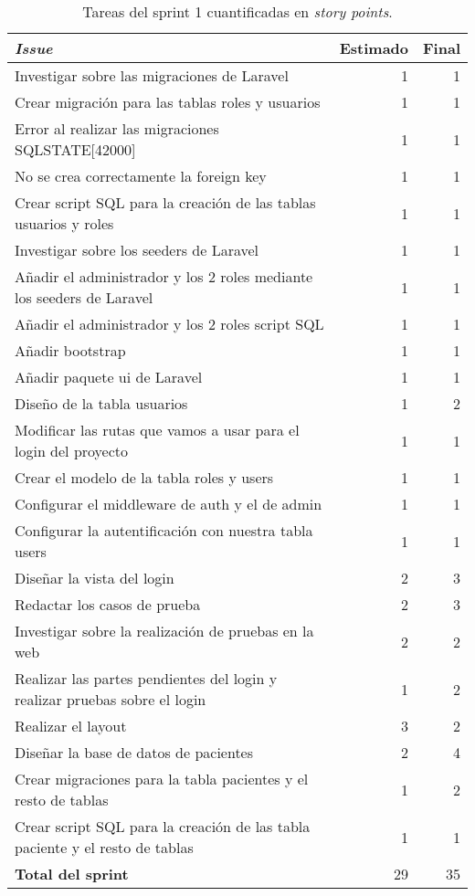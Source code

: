 \begin{table}[H]
	 \begin{tabularx}{\linewidth}{X r r}
	 	\toprule \textbf{\textit{Issue}} & \textbf{Estimado} & \textbf{Final}\\
	 	\toprule
	 	Investigar sobre las migraciones de Laravel  & 1 & 1 \\
	 	Crear migración para las tablas roles y usuarios & 1 & 1\\
	 	Error al realizar las migraciones SQLSTATE[42000] & 1 & 1 \\
	 	No se crea correctamente la foreign key & 1 & 1 \\
	 	Crear script SQL para la creación de las tablas usuarios y roles & 1 & 1 \\
	 	Investigar sobre los seeders de Laravel & 1 & 1 \\
	 	Añadir el administrador y los 2 roles mediante los seeders de Laravel & 1 & 1 \\
	 	Añadir el administrador y los 2 roles script SQL & 1 & 1 \\
	 	Añadir bootstrap & 1 & 1\\
	 	Añadir paquete ui de Laravel & 1 & 1 \\
	 	Diseño de la tabla usuarios & 1 & 2 \\
	 	Modificar las rutas que vamos a usar para el login del proyecto & 1 & 1 \\
	 	Crear el modelo de la tabla roles y users & 1 & 1 \\
	 	Configurar el middleware de auth y el de admin & 1 & 1 \\
	    Configurar la autentificación con nuestra tabla users & 1 & 1 \\
	 	Diseñar la vista del login & 2 & 3 \\
	 	Redactar los casos de prueba & 2 & 3 \\
	 	Investigar sobre la realización de pruebas en la web & 2 & 2 \\
	 	Realizar las partes pendientes del login y realizar pruebas sobre el login & 1 & 2 \\
	 	Realizar el layout & 3 & 2\\
	 	Diseñar la base de datos de pacientes & 2 & 4 \\
	 	Crear migraciones para la tabla pacientes y el resto de tablas & 1 & 2  \\
	 	Crear script SQL para la creación de las tabla paciente y el resto de tablas & 1 & 1 \\
	 	\midrule
	    \textbf{Total del sprint} & 29 & 35 \\
	 	\bottomrule
	 \end{tabularx}
	 \caption{Tareas del sprint 1 cuantificadas en \textit{story points}.}
\end{table}
